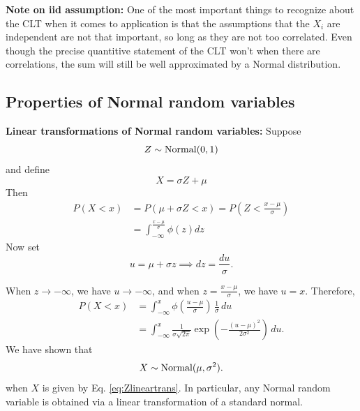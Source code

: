  {\bf Note on iid assumption:} One of the most important things to recognize about the CLT when it comes to application is that the assumptions that the $X_i$ are independent are not that important, so long as they are not too correlated. Even though the precise quantitive statement of the CLT won't when there are correlations, the sum will still be well approximated by a Normal distribution. 






\subsection{Properties of Normal random variables}

 {\bf Linear transformations of Normal random variables:}  Suppose 
\begin{equation*}
Z \sim {\rm Normal}(0,1)
\end{equation*}
and define 
\begin{equation}\label{eq:Zlineartrans}
X = \sigma Z + \mu 
\end{equation}
Then 
\begin{align*}
P(X<x) &= P(\mu + \sigma Z<x) = P\left(Z<\frac{x - \mu}{\sigma}\right)\\
&= \int_{-\infty}^{\frac{x - \mu}{\sigma}}\phi(z)dz
\end{align*}
\noindent
Now set
\[
u = \mu + \sigma z \implies dz = \frac{du}{\sigma}.
\]

\noindent
When $z \to -\infty$, we have $u \to -\infty$, and when 
$z = \frac{x-\mu}{\sigma}$, we have $u = x$. Therefore,
\begin{align*}
P(X<x) 
&= \int_{-\infty}^{x} 
\phi\!\left(\frac{u-\mu}{\sigma}\right)\,\frac{1}{\sigma}\,du \\
&= \int_{-\infty}^{x} 
\frac{1}{\sigma\sqrt{2\pi}}
\exp\!\left(-\frac{(u-\mu)^2}{2\sigma^2}\right)\,du.
\end{align*}
We have shown that 
\begin{equation*}
X \sim {\rm Normal}(\mu,\sigma^2).
\end{equation*} 
when $X$ is given by Eq. \ref{eq:Zlineartrans}. In particular, any Normal random variable is obtained via a linear transformation of a standard normal. 



